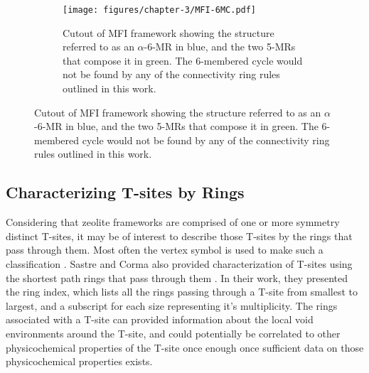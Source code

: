 \documentclass[preprint,numrefs,noinfo,sort&compress]{elsarticle}
\providecommand{\DIFaddbegin}{} %
\providecommand{\DIFaddend}{} %
\providecommand{\DIFdelbegin}{} %
\providecommand{\DIFdelend}{} %
\newcommand{\DIFscaledelfig}{0.5}
\newlength{\DIFdelgraphicswidth} %
\newlength{\DIFdelgraphicsheight} %
\newcommand{\DIFaddincludegraphics}[2][]{{\color{blue}\fbox{\DIFOincludegraphics[#1]{#2}}}} %
\newcommand{\DIFdelincludegraphics}[2][]{%
\sbox{\DIFdelgraphicsbox}{\DIFOincludegraphics[#1]{#2}}%
\settoboxwidth{\DIFdelgraphicswidth}{\DIFdelgraphicsbox} %
\settoboxtotalheight{\DIFdelgraphicsheight}{\DIFdelgraphicsbox} %
\scalebox{\DIFscaledelfig}{%
\parbox[b]{\DIFdelgraphicswidth}{\usebox{\DIFdelgraphicsbox}\\[-\baselineskip] \rule{\DIFdelgraphicswidth}{0em}}\llap{\resizebox{\DIFdelgraphicswidth}{\DIFdelgraphicsheight}{%
\setlength{\unitlength}{\DIFdelgraphicswidth}%
\begin{picture}(1,1)%
\thicklines\linethickness{2pt} %
{\color[rgb]{1,0,0}\put(0,0){\framebox(1,1){}}}%
{\color[rgb]{1,0,0}\put(0,0){\line( 1,1){1}}}%
{\color[rgb]{1,0,0}\put(0,1){\line(1,-1){1}}}%
\end{picture}%
}\hspace*{3pt}}} %
} %
\DeclareRobustCommand{\DIFaddbegin}{\DIFOaddbegin \let\includegraphics\DIFaddincludegraphics} %
\DeclareRobustCommand{\DIFaddend}{\DIFOaddend \let\includegraphics\DIFOincludegraphics} %
\DeclareRobustCommand{\DIFdelbegin}{\DIFOdelbegin \let\includegraphics\DIFdelincludegraphics} %
\DeclareRobustCommand{\DIFdelend}{\DIFOaddend \let\includegraphics\DIFOincludegraphics} %
\begin{document}
\begin{figure}
\begin{figure}[H]
\centering
\texttt{[image: figures/chapter-3/MFI-6MC.pdf]}
\caption{Cutout of MFI framework showing the structure referred to as an \(\alpha\)-6-MR in blue, and the two 5-MRs that compose it in green. The 6-membered cycle would not be found by any of the connectivity ring rules outlined in this work. \label{fig:mfi-6}}
\end{figure}
\end{figure}

\subsection{Characterizing T-sites by Rings}
\DIFdelbegin %
\DIFdelend \DIFaddbegin \label{sec:org6b7283b}
\DIFaddend 

Considering that zeolite frameworks are comprised of one or more symmetry distinct T-sites, it may be of interest to describe those T-sites by the rings that pass through them. Most often the vertex symbol is used to make such a classification \cite{okeeffe-vertex-1997}. Sastre and Corma also provided characterization of T-sites using the shortest path rings that pass through them \cite{sastre-topological-2009}. In their work, they presented the ring index, which lists all the rings passing through a T-site from smallest to largest, and a subscript for each size representing it's multiplicity.  The rings associated with a T-site can provided information about the local void environments around the T-site, and could potentially be correlated to other physicochemical properties of the T-site once enough once sufficient data on those physicochemical properties exists. 
\end{document}
